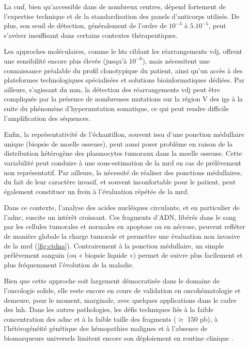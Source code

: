 La \gls{cmf}, bien qu'accessible dans de nombreux centres, dépend fortement de
l'expertise technique et de la standardisation des panels d'anticorps utilisés.
De plus, son seuil de détection, généralement de l'ordre de $10^{-3}$ à
$5.10^{-5}$, peut s'avérer insuffisant dans certains contextes thérapeutiques.

Les approches moléculaires, comme le \gls{hts} ciblant les réarrangements
\gls{vdj}, offrent une sensibilité encore plus élevée (jusqu'à $10^{-6}$), mais
nécessitent une connaissance préalable du profil clonotypique du patient, ainsi
qu'un accès à des plateformes technologiques spécialisées et solutions
bioinformatiques dédiées. Par ailleurs, s'agissant du \gls{mm}, la détection
des réarrangements \gls{vdj} peut être compliquée par la présence de nombreuses
mutations sur la région V des \glspl{ig} à la suite du phénomène
d'hypermutation somatique, ce qui peut rendre difficile l'amplification des
séquences.

Enfin, la représentativité de l'échantillon, souvent issu d'une ponction
médullaire unique (biopsie de moelle osseuse), peut aussi poser problème en
raison de la distribution hétérogène des plasmocytes tumoraux dans la moelle
osseuse. Cette variabilité peut conduire à une sous-estimation de la \gls{mrd}
en cas de prélèvement non représentatif. Par ailleurs, la nécessité de réaliser
des ponctions médullaires, du fait de leur caractère invasif, et souvent
inconfortable pour le patient, peut également constituer un frein à
l'évaluation répétée de la \gls{mrd}.

Dans ce contexte, l'analyse des acides nucléiques circulants, et en particulier
de l'\gls{adnc}, suscite un intérêt croissant. Ces fragments d'ADN, libérés
dans le sang par les cellules tumorales et normales en apoptose ou en nécrose,
peuvent refléter de manière globale la charge tumorale et permettre une
évaluation non invasive de la \gls{mrd} (\autoref{fig:ctdna}). Contrairement à
la ponction médullaire, un simple prélèvement sanguin (ou « biopsie liquide »)
permet de suivre plus facilement et plus fréquemment l'évolution de la maladie.

Bien que cette approche soit largement démocratisée dans le domaine de
l'oncologie solide, elle reste encore en cours de validation en oncohématologie
et demeure, pour le moment, marginale, avec quelques applications dans le cadre
des \gls{lnh}. Dans les autres pathologies, les défis techniques liés à la
faible concentration des \gls{adnc} et à la faible taille des fragments
($\approx$ 150 pb), à l'hétérogénéité génétique des hémopathies malignes et à
l'absence de biomarqueurs universels limitent encore son déploiement en routine
clinique \cite{daoUsingCfDNACtDNA2023}.

